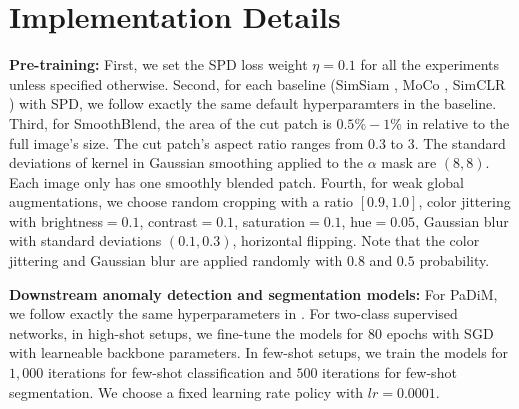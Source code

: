 \documentclass[runningheads]{llncs}
\begin{document}
\section{Implementation Details}
\noindent\textbf{Pre-training:} First, we set the SPD loss weight $\eta=0.1$ for all the experiments unless specified otherwise. Second, for each baseline (SimSiam \cite{chen2021exploring}, MoCo \cite{he2020momentum}, SimCLR \cite{chen2020simple}) with SPD, we follow exactly the same default hyperparamters in the baseline. Third, for SmoothBlend, the area of the cut patch is $0.5\% - 1\%$ in relative to the full image's size. The cut patch's aspect ratio ranges from $0.3$ to $3$. The standard deviations of kernel in Gaussian smoothing applied to the $\alpha$ mask are $(8,8)$. Each image only has one smoothly blended patch. Fourth, for weak global augmentations, we choose random cropping with a ratio $[0.9,1.0]$, color jittering with brightness$=0.1$, contrast$=0.1$, saturation$=0.1$, hue$=0.05$, Gaussian blur with standard deviations $(0.1, 0.3)$, horizontal flipping. Note that the color jittering and Gaussian blur are applied randomly with $0.8$ and $0.5$ probability.

\noindent\textbf{Downstream anomaly detection and segmentation models:} For PaDiM, we follow exactly the same hyperparameters in \cite{defard2021padim}. For two-class supervised networks, in high-shot setups, we fine-tune the models for 80 epochs with SGD with learneable backbone parameters. In few-shot setups, we train the models for $1,000$ iterations for few-shot classification and $500$ iterations for few-shot segmentation. We choose a fixed learning rate policy with $lr=0.0001$.
\end{document}
